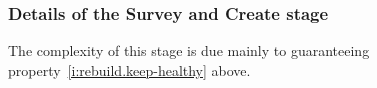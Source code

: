 \documentclass[11pt]{memoir}
\theoremstyle{definition} %
\begin{document}


  


\subsubsection*{Details of the Survey and Create stage}

The complexity of this stage is due mainly to guaranteeing
property~\eqref{i:rebuild.keep-healthy} above.
\end{document}
